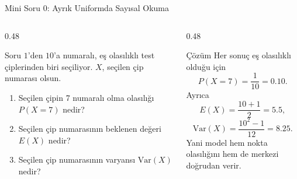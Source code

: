 \documentclass[light]{lutbeamer}
\begin{document}
\begin{frame}{Mini Soru 0: Ayrık Uniformda Sayısal Okuma}
    \scriptsize
    \begin{columns}[T,onlytextwidth]
        \begin{column}{0.48\textwidth}
            \begin{block}{Soru}
                \(1\)'den \(10\)'a numaralı, eş olasılıklı test çiplerinden biri seçiliyor.
                \(X\), seçilen çip numarası olsun.
                \begin{enumerate}
                    \item[(a)] Seçilen çipin 7 numaralı olma olasılığı \(P(X=7)\) nedir?
                    \item[(b)] Seçilen çip numarasının beklenen değeri \(E(X)\) nedir?
                    \item[(c)] Seçilen çip numarasının varyansı \(\mathrm{Var}(X)\) nedir?
                \end{enumerate}
            \end{block}
        \end{column}
        \begin{column}{0.48\textwidth}
            \begin{exampleblock}{Çözüm}
                Her sonuç eş olasılıklı olduğu için
                \[
                P(X=7)=\frac{1}{10}=0.10.
                \]
                Ayrıca
                \[
                E(X)=\frac{10+1}{2}=5.5,
                \]
                \[
                \mathrm{Var}(X)=\frac{10^2-1}{12}=8.25.
                \]
                Yani model hem nokta olasılığını hem de merkezi doğrudan verir.
            \end{exampleblock}
        \end{column}
    \end{columns}
\end{frame}
\end{document}
